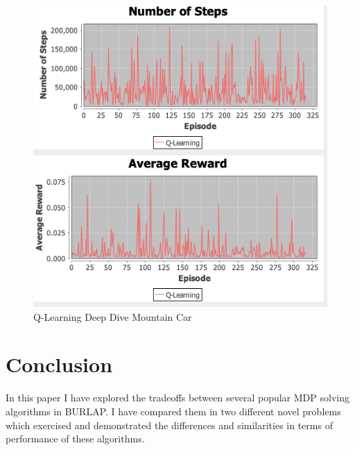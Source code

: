 \documentclass[11pt]{article}
\newcommand{\problemtwo}{Mountain Car}
\begin{document}
    \begin{figure}
        \centering
        \includegraphics[width=1\linewidth]{qlearningextended.png}
        \caption{Q-Learning Deep Dive \problemtwo}\label{Fig:Q-Learning Deep Dive \problemtwo}
    \end{figure}


    \section{Conclusion}
    In this paper I have explored the tradeoffs between several popular MDP solving algorithms in BURLAP.
    I have compared them in two different novel problems which exercised and demonstrated the differences and similarities
    in terms of performance of these algorithms.
    
    
\end{document}
